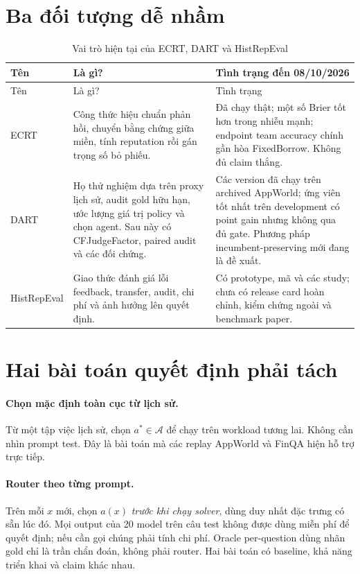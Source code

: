 \documentclass[11pt,a4paper,openany]{book}
\begin{document}
\section{Ba đối tượng dễ nhầm}
\begin{longtable}{p{31mm}p{58mm}p{63mm}}\caption{Vai trò hiện tại của ECRT, DART và HistRepEval}\label{tab:entities}\\\toprule Tên & Là gì? & Tình trạng đến 08/10/2026\\\midrule\endfirsthead\toprule Tên & Là gì? & Tình trạng\\\midrule\endhead
ECRT & Công thức hiệu chuẩn phản hồi, chuyển bằng chứng giữa miền, tính reputation rồi gán trọng số bỏ phiếu. & Đã chạy thật; một số Brier tốt hơn trong nhiễu mạnh; endpoint team accuracy chính gần hòa FixedBorrow. Không đủ claim thắng.\\
DART & Họ thử nghiệm dựa trên proxy lịch sử, audit gold hữu hạn, ước lượng giá trị policy và chọn agent. Sau này có CFJudgeFactor, paired audit và các đối chứng. & Các version đã chạy trên archived AppWorld; ứng viên tốt nhất trên development có point gain nhưng không qua đủ gate. Phương pháp incumbent-preserving mới đang là đề xuất.\\
HistRepEval & Giao thức đánh giá lỗi feedback, transfer, audit, chi phí và ảnh hưởng lên quyết định. & Có prototype, mã và các study; chưa có release card hoàn chỉnh, kiểm chứng ngoài và benchmark paper.\\\bottomrule\end{longtable}

\section{Hai bài toán quyết định phải tách}
\paragraph{Chọn mặc định toàn cục từ lịch sử.} Từ một tập việc lịch sử, chọn \(a^*\in\mathcal A\) để chạy trên workload tương lai. Không cần nhìn prompt test. Đây là bài toán mà các replay AppWorld và FinQA hiện hỗ trợ trực tiếp.
\paragraph{Router theo từng prompt.} Trên mỗi \(x\) mới, chọn \(a(x)\) \emph{trước khi chạy solver}, dùng duy nhất đặc trưng có sẵn lúc đó. Mọi output của 20 model trên câu test không được dùng miễn phí để quyết định; nếu cần gọi chúng phải tính chi phí. Oracle per-question dùng nhãn gold chỉ là trần chẩn đoán, không phải router. Hai bài toán có baseline, khả năng triển khai và claim khác nhau.
\end{document}
